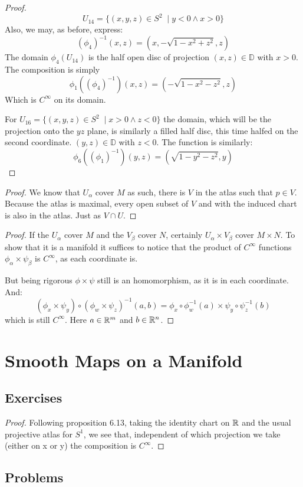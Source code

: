\prob
\begin{proof}
	$$U_{14} = \{(x,y,z) \in S^2\;\mid y<0 \land x>0 \}$$
	Also, we may, as before, express:
	$$(\phi_4)^{-1}(x,z) = (x,-\sqrt{1 - x^2 + z^2},z)$$
	The domain $\phi_4(U_14)$ is the half open disc of projection $(x,z) \in \mathbb{D}$ with $x > 0$.
	The composition is simply
	$$\phi_1((\phi_4)^{-1})(x,z) = (-\sqrt{1 - x^2 - z^2}, z)$$
	Which is $C^\infty$ on its domain.

	For $U_{16} = \{(x,y,z) \in S^2\;\mid x>0 \land z<0 \}$ the domain, which will be the projection onto the $yz$ plane,
	is similarly a filled half disc, this time halfed on the second coordinate. $(y,z) \in \mathbb{D}$ with $z < 0$.
	The function is similarly:
	$$\phi_6((\phi_1)^{-1})(y,z) = (\sqrt{1 - y^2 - z^2}, y)$$
\end{proof}

\prob
\begin{proof}
	We know that $U_\alpha$ cover $M$ as such, there is $V$ in the atlas such that $p \in V$. Because
	the atlas is maximal, every open subset of $V$ and with the induced chart is also in the atlas.
	Just as $V \cap U$.
\end{proof}

\prob
\begin{proof}
	If the $U_\alpha$ cover $M$ and the $V_\beta$ cover $N$, certainly $U_\alpha \times V_\beta$ cover $M\times N$. To show
	that it is a manifold it suffices to notice that the product of $C^\infty$ functions $\phi_\alpha \times \psi_\beta$ is
	$C^\infty$, as each coordinate is.

	But being rigorous $\phi \times \psi$ still is an homomorphism, as it is in each coordinate. And:
	$$(\phi_x \times \psi_y) \circ (\phi_w \times \psi_z)^{-1}(a,b) = \phi_x \circ \phi_w^{-1}(a) \times \psi_y \circ \psi_z^{-1}(b)$$
	which is still $C^\infty$. Here $a \in \mathbb{R}^m$ and $b \in \mathbb{R}^n$.
\end{proof}

\section{Smooth Maps on a Manifold}
\subsection{Exercises}
\begin{proof}
	Following proposition 6.13, taking the identity chart on $\mathbb{R}$ and the usual projective atlas for $S^1$, we see that, independent
	of which projection we take (either on x or y) the composition is $C^\infty$.
\end{proof}


\subsection{Problems}
